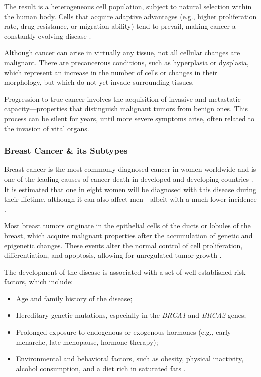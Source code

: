 The result is a heterogeneous cell population, subject to natural selection within the human body. Cells that acquire 
adaptive advantages (e.g., higher proliferation rate, drug resistance, or migration ability) tend to prevail, making 
cancer a constantly evolving disease \cite{def_of_cancer_Brown2023}.

Although cancer can arise in virtually any tissue, not all cellular changes are malignant. There are precancerous 
conditions, such as hyperplasia or dysplasia, which represent an increase in the number of cells or changes in their 
morphology, but which do not yet invade surrounding tissues.

Progression to true cancer involves the acquisition of invasive and metastatic capacity—properties that distinguish 
malignant tumors from benign ones. This process can be silent for years, until more severe symptoms arise, often related 
to the invasion of vital organs.

\subsubsection*{Breast Cancer \& its Subtypes}

Breast cancer is the most commonly diagnosed cancer in women worldwide and is one of the leading causes of cancer death 
in developed and developing countries \cite{BreastEpidemiology_Romanowicz2022, updatedbca_Hong2022Breast}. It is estimated that one in eight women 
will be diagnosed with this disease during their lifetime, although it can also affect men—albeit with a much lower 
incidence \cite{BreastEpidemiology_Romanowicz2022}.

Most breast tumors originate in the epithelial cells of the ducts or lobules of the breast, which acquire malignant 
properties after the accumulation of genetic and epigenetic changes. These events alter the normal control of cell 
proliferation, differentiation, and apoptosis, allowing for unregulated tumor growth \cite{origins_and_evolution_bca_Polyak2007}.

The development of the disease is associated with a set of well-established risk factors, which include:
\begin{itemize}
    \item Age and family history of the disease;
    \item Hereditary genetic mutations, especially in the \textit{BRCA1} and \textit{BRCA2} genes;
    \item Prolonged exposure to endogenous or exogenous hormones (e.g., early menarche, late menopause, hormone therapy);
    \item Environmental and behavioral factors, such as obesity, physical inactivity, alcohol consumption, and a diet rich 
    in saturated fats \cite{BreastEpidemiology_Romanowicz2022,clinical_implication_bca_Adamo2015}.
\end{itemize}

